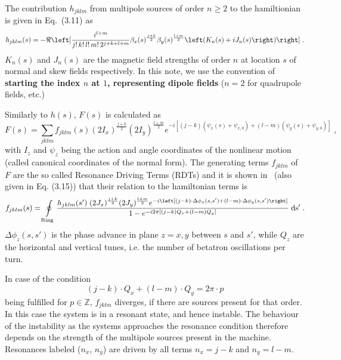 The contribution $h_{jklm}$ from multipole sources of order $n \geq 2$ to the hamiltionian is given in 
\cite{FranchiStudiesMeasurementsLinear2006} Eq.~(3.11) as 
%
\begin{equation}
    \label{eq:HamiltonianTermsMultipoleSources}
    h_{jklm}(s) = 
    -\ReOf{    
     \frac{i^{l+m}}{j! \, k! \, l! \, m! \, 2^{j+k+l+m}}
    \beta_x(s)^{\frac{j+k}{2}}\beta_y(s)^{\frac{l+m}{2}} 
    \left(K_{n}(s) + iJ_{n}(s)\right)
     } \; .
\end{equation}
%
$K_n(s)$ and $J_n(s)$ are the magnetic field strengths of order $n$ at location $s$ of normal and skew fields respectively.
In this note, we use the convention of \textbf{starting the index $n$ at $1$, representing dipole fields} 
($n=2$ for quadrupole fields, etc.)

Similarly to $h(s)$, $F(s)$ is calculated as 
%
\begin{equation}
    \label{eq:NormalFormGeneratingFunction}
    F(s) = \sum\limits_{jklm} f_{jklm}(s) (2I_x)^{\frac{j+k}{2}}(2I_y)^{\frac{l+m}{2}} e^{-i\left[(j-k)(\psi_x(s) + \psi_{x,0}) + (l-m)(\psi_y(s) + \psi_{y,0})\right]} \; ,
\end{equation}
% 
with $I_z$ and $\psi_z$ being the action and angle coordinates of the nonlinear motion (called canonical coordinates of the normal form).
The generating terms $f_{jklm}$ of $F$ are the so called Resonance Driving Terms (RDTs) and it is shown 
in~\cite{ForestHamiltonianFreeDescription1990} (also given in \cite{FranchiStudiesMeasurementsLinear2006} Eq. (3.15)) that their relation to the hamiltonian terms is
%
\begin{equation}
    \label{eq:RDTHamiltonianRelation}
    f_{jklm}(s) = 
    \oint\limits_{\text{Ring}} \frac{h_{jklm}(s') \; (2J_x)^{\frac{j+k}{2}}(2J_y)^{\frac{l+m}{2}} 
    e^{-i\left[(j-k)\cdot\Delta\phi_x(s, s') + (l-m)\cdot\Delta\phi_y(s, s')\right]}}{1 - e^{-i2\pi[(j-k)Q_x + (l-m)Q_y]}} \;  \rm{d}s' \;.
\end{equation}
%
$\Delta\phi_z(s, s')$ is the phase advance in plane $z = x, y$ between $s$ and $s'$,
 while $Q_z$ are the horizontal and vertical tunes, i.e. the number of betatron oscillations per turn.


In case of the condition 
%
\begin{equation}
    \label{eq:ResonanceCondition}
    (j-k) \cdot Q_x + (l-m) \cdot Q_y = 2\pi \cdot p 
\end{equation}
%
being fulfilled for $p \in \mathbb{Z}$, $f_{jklm}$ diverges, if there are sources present for that order.
In this case the system is in a resonant state, and hence instable.
The behaviour of the instability as the systems approaches the resonance condition therefore depends 
on the strength of the multipole sources present in the machine.
Resonances labeled ($n_x$, $n_y$) are driven by all terms $n_x = j-k$ and $n_y = l - m$.

